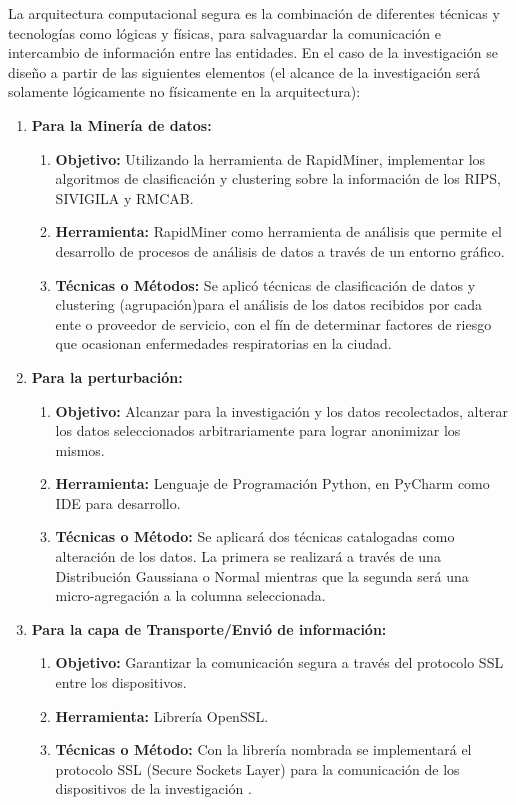 \documentclass[a4paper,openright,12pt]{book}
\theoremstyle{definition}
\theoremstyle{remark}
\begin{document}
La arquitectura computacional segura es la combinación de diferentes técnicas y tecnologías como lógicas y físicas, para salvaguardar la comunicación e intercambio de información entre las entidades. En el caso de la investigación se diseño a partir de las siguientes elementos (el alcance de la investigación será solamente lógicamente no físicamente en la arquitectura):
\begin{enumerate}
	\item \textbf{Para la Minería de datos:}
    \begin{enumerate}
    	\item \textbf{Objetivo:} Utilizando la herramienta de RapidMiner, implementar los algoritmos de clasificación y clustering sobre la información de los RIPS, SIVIGILA y RMCAB.
		\item \textbf{Herramienta:} RapidMiner como herramienta de análisis que permite el desarrollo de procesos de análisis de datos a través de un entorno gráfico.
        \item \textbf{Técnicas o Métodos:} Se aplicó técnicas de clasificación de datos y clustering (agrupación)para el análisis de los datos recibidos por cada ente o proveedor de servicio, con el fín de determinar factores de riesgo que ocasionan enfermedades respiratorias en la ciudad.
    \end{enumerate}
    \item \textbf{Para la perturbación:}
    \begin{enumerate}
		\item \textbf{Objetivo:} Alcanzar para la investigación y los datos recolectados, alterar los datos seleccionados arbitrariamente para lograr anonimizar los mismos.
        \item \textbf{Herramienta:} Lenguaje de Programación Python, en PyCharm como IDE para desarrollo.
        \item \textbf{Técnicas o Método:} Se aplicará dos técnicas catalogadas como alteración de los datos. La primera se realizará a través de una Distribución Gaussiana o Normal mientras que la segunda será una micro-agregación a la columna seleccionada.
	\end{enumerate}
    \item \textbf{Para la capa de Transporte/Envió de información:} 
        \begin{enumerate}
		\item \textbf{Objetivo:} Garantizar la comunicación segura a través del protocolo SSL entre los dispositivos.
        \item \textbf{Herramienta:} Librería OpenSSL.
        \item \textbf{Técnicas o Método:} Con la librería nombrada se implementará el protocolo SSL (Secure Sockets Layer) para la comunicación de los dispositivos de la investigación .
	\end{enumerate}
\end{enumerate}
\end{document}
